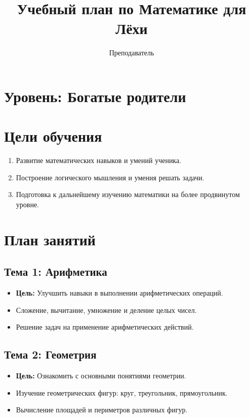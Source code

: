 \documentclass{article}
\begin{document}
\title{Учебный план по Математике для Лёхи}
\author{Преподаватель}
\date{}

\maketitle

\section*{Уровень: Богатые родители}

\section{Цели обучения}
\begin{enumerate}
    \item Развитие математических навыков и умений ученика.
    \item Построение логического мышления и умения решать задачи.
    \item Подготовка к дальнейшему изучению математики на более продвинутом уровне.
\end{enumerate}

\section{План занятий}

\subsection{Тема 1: Арифметика}
\begin{itemize}
    \item \textbf{Цель:} Улучшить навыки в выполнении арифметических операций.
    \item Сложение, вычитание, умножение и деление целых чисел.
    \item Решение задач на применение арифметических действий.
\end{itemize}

\subsection{Тема 2: Геометрия}
\begin{itemize}
    \item \textbf{Цель:} Ознакомить с основными понятиями геометрии.
    \item Изучение геометрических фигур: круг, треугольник, прямоугольник.
    \item Вычисление площадей и периметров различных фигур.
\end{itemize}
\end{document}
